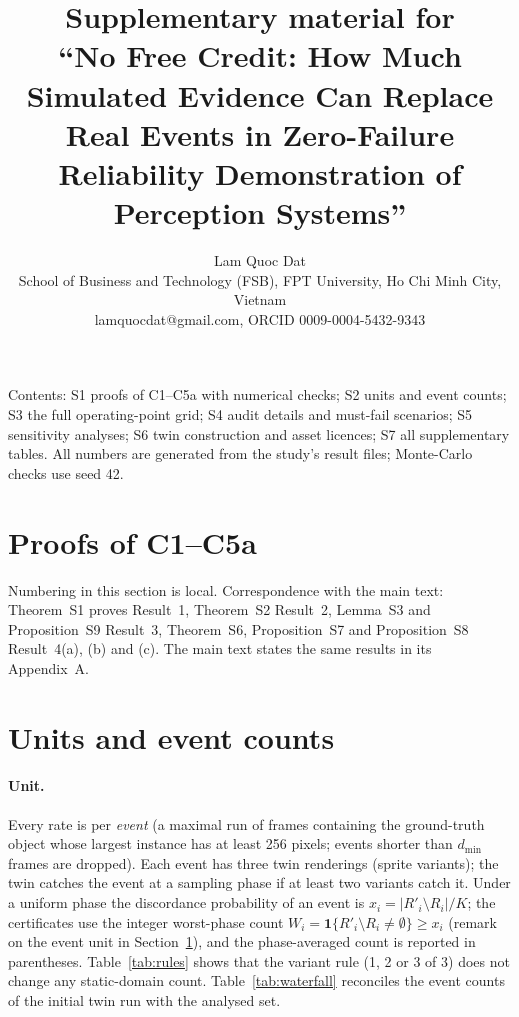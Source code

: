 \documentclass[11pt]{article}
\title{Supplementary material for\\ ``No Free Credit: How Much Simulated Evidence Can Replace Real Events in
Zero-Failure Reliability Demonstration of Perception Systems''}
\author{Lam Quoc Dat\\ \small School of Business and Technology (FSB), FPT University, Ho Chi Minh City, Vietnam\\ \small lamquocdat@gmail.com, ORCID 0009-0004-5432-9343}
\date{}
\theoremstyle{definition}
\theoremstyle{remark}
\begin{document}
\maketitle

\noindent Contents: S1 proofs of C1--C5a with numerical checks; S2 units and event counts; S3 the full operating-point
grid; S4 audit details and must-fail scenarios; S5 sensitivity analyses; S6 twin construction and asset licences;
S7 all supplementary tables.
All numbers are generated from the study's result files; Monte-Carlo checks use seed 42.

\section{Proofs of C1--C5a}\label{sec:proofs}
Numbering in this section is local. Correspondence with the main text: Theorem~S1 proves Result~1, Theorem~S2
Result~2, Lemma~S3 and Proposition~S9 Result~3, Theorem~S6, Proposition~S7 and Proposition~S8 Result~4(a), (b)
and (c). The main text states the same results in its Appendix~A.
\renewcommand{\thetheorem}{S\arabic{theorem}}
{\let\section\subsection

}

\section{Units and event counts}\label{sec:units}
\paragraph{Unit.} Every rate is per \emph{event} (a maximal run of frames containing the ground-truth object whose
largest instance has at least 256 pixels; events shorter than $d_{\min}$ frames are dropped). Each event has three twin
renderings (sprite variants); the twin catches the event at a sampling phase if at least two variants catch it. Under a
uniform phase the discordance probability of an event is $x_i=|R'_i\setminus R_i|/K$; the certificates use the
integer worst-phase count $W_i=\mathbf 1\{R'_i\setminus R_i\ne\emptyset\}\ge x_i$ (remark on the event unit in Section~\ref{sec:proofs}), and the phase-averaged count is reported in parentheses. Table~\ref{tab:rules} shows that the variant
rule (1, 2 or 3 of 3) does not change any static-domain count. Table~\ref{tab:waterfall} reconciles the event counts
of the initial twin run with the analysed set.
\end{document}

